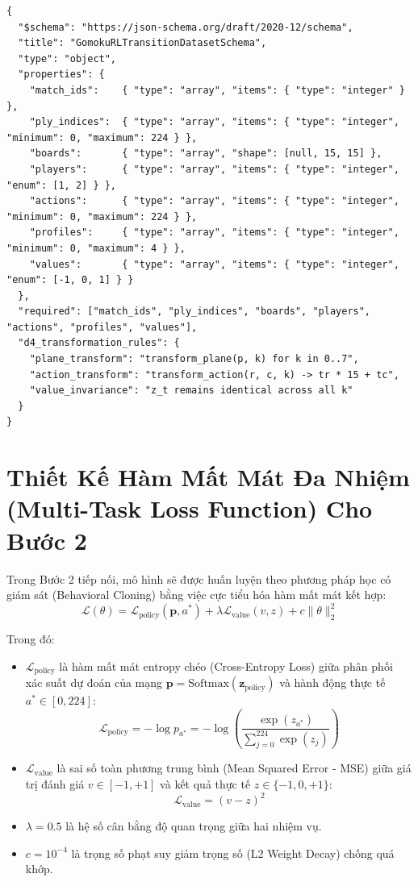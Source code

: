 \documentclass[11pt,a4paper]{report}
\begin{document}
\begin{lstlisting}[caption={Trích đoạn lược đồ JSON Schema của tập dữ liệu Gomoku RL Transition.}]
{
  "$schema": "https://json-schema.org/draft/2020-12/schema",
  "title": "GomokuRLTransitionDatasetSchema",
  "type": "object",
  "properties": {
    "match_ids":    { "type": "array", "items": { "type": "integer" } },
    "ply_indices":  { "type": "array", "items": { "type": "integer", "minimum": 0, "maximum": 224 } },
    "boards":       { "type": "array", "shape": [null, 15, 15] },
    "players":      { "type": "array", "items": { "type": "integer", "enum": [1, 2] } },
    "actions":      { "type": "array", "items": { "type": "integer", "minimum": 0, "maximum": 224 } },
    "profiles":     { "type": "array", "items": { "type": "integer", "minimum": 0, "maximum": 4 } },
    "values":       { "type": "array", "items": { "type": "integer", "enum": [-1, 0, 1] } }
  },
  "required": ["match_ids", "ply_indices", "boards", "players", "actions", "profiles", "values"],
  "d4_transformation_rules": {
    "plane_transform": "transform_plane(p, k) for k in 0..7",
    "action_transform": "transform_action(r, c, k) -> tr * 15 + tc",
    "value_invariance": "z_t remains identical across all k"
  }
}
\end{lstlisting}

\section{Thiết Kế Hàm Mất Mát Đa Nhiệm (Multi-Task Loss Function) Cho Bước 2}

Trong Bước 2 tiếp nối, mô hình sẽ được huấn luyện theo phương pháp học có giám sát (Behavioral Cloning) bằng việc cực tiểu hóa hàm mất mát kết hợp:
\begin{equation}
    \mathcal{L}(\theta) = \mathcal{L}_{\text{policy}}(\mathbf{p}, a^*) + \lambda \mathcal{L}_{\text{value}}(v, z) + c \|\theta\|_2^2
\end{equation}

Trong đó:
\begin{itemize}
    \item $\mathcal{L}_{\text{policy}}$ là hàm mất mát entropy chéo (Cross-Entropy Loss) giữa phân phối xác suất dự đoán của mạng $\mathbf{p} = \text{Softmax}(\mathbf{z}_{\text{policy}})$ và hành động thực tế $a^* \in [0, 224]$:
    \begin{equation}
        \mathcal{L}_{\text{policy}} = -\log p_{a^*} = -\log \left( \frac{\exp(z_{a^*})}{\sum_{j=0}^{224} \exp(z_j)} \right)
    \end{equation}
    \item $\mathcal{L}_{\text{value}}$ là sai số toàn phương trung bình (Mean Squared Error - MSE) giữa giá trị đánh giá $v \in [-1, +1]$ và kết quả thực tế $z \in \{-1, 0, +1\}$:
    \begin{equation}
        \mathcal{L}_{\text{value}} = (v - z)^2
    \end{equation}
    \item $\lambda = 0.5$ là hệ số cân bằng độ quan trọng giữa hai nhiệm vụ.
    \item $c = 10^{-4}$ là trọng số phạt suy giảm trọng số (L2 Weight Decay) chống quá khớp.
\end{itemize}
\end{document}
